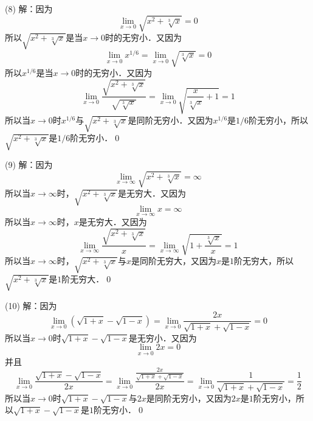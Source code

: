 \medskip
(8) 解：因为
\begin{equation}
    \lim_{x \to 0} \sqrt{x^2+\sqrt[3]{x}} = 0
\end{equation}
所以$\sqrt{x^2+\sqrt[3]{x}}$是当$x \to 0$时的无穷小．又因为
\begin{equation}
    \lim_{x \to 0} {\displaystyle x^{1/6}} = \lim_{x \to 0} \sqrt{\sqrt[3]{x}} = 0
\end{equation}
所以$x^{1/6}$是当$x \to 0$时的无穷小．又因为
\begin{equation}
    \lim_{x \to 0} \displaystyle\frac{\sqrt{x^2+\sqrt[3]{x}}}{\sqrt{\sqrt[3]{x}}} = \lim_{x \to 0} \displaystyle\sqrt{\displaystyle\frac{x}{\sqrt[3]{x}}+1} = 1
\end{equation}
所以当$x \to 0$时$x^{1/6}$与$\displaystyle\sqrt{x^2+\sqrt[3]{x}}$是同阶无穷小．又因为$x^{1/6}$是$1/6$阶无穷小，所以$\displaystyle\sqrt{x^2+\sqrt[3]{x}}$是$1/6$阶无穷小．\qed

\medskip
(9) 解：因为
\begin{equation}
    \lim_{x \to \infty} \sqrt{x^2+\sqrt[3]{x}} = \infty
\end{equation}
所以当$x \to \infty$时，$\displaystyle\sqrt{x^2+\sqrt[3]{x}}$是无穷大．又因为
\begin{equation}
    \lim_{x \to \infty} x = \infty
\end{equation}
所以当$x \to \infty$时，$x$是无穷大．又因为
\begin{equation}
    \lim_{x \to \infty} \frac{\sqrt{x^2+\sqrt[3]{x}}}{x} = \lim_{x \to \infty} \sqrt{1 + \displaystyle\frac{\sqrt[3]{x}}{x}} = 1
\end{equation}
所以当$x \to \infty$时，$\sqrt{x^2+\sqrt[3]{x}}$与$x$是同阶无穷大，又因为$x$是$1$阶无穷大，所以$\sqrt{x^2 + \sqrt[3]{x}}$是$1$阶无穷大．\qed

\medskip
(10) 解：因为
\begin{equation}
    \lim_{x \to 0} \left( \sqrt{1+x} - \sqrt{1-x} \right) = \lim_{x \to 0} \frac{2x}{\sqrt{1+x}+\sqrt{1-x}} = 0
\end{equation}
所以当$x \to 0$时$\sqrt{1+x}-\sqrt{1-x}$是无穷小．又因为
\begin{equation}
    \lim_{x \to 0} 2x = 0
\end{equation}
并且
\begin{equation}
    \lim_{x \to 0} \displaystyle\frac{\sqrt{1+x}-\sqrt{1-x}}{2x}=\lim_{x \to 0} \displaystyle\frac{\displaystyle\frac{2x}{\sqrt{1+x}+\sqrt{1-x}}}{2x} = \lim_{x \to 0} \frac{1}{\sqrt{1+x}+\sqrt{1-x}} = \frac{1}{2}
\end{equation}
所以当$x \to 0$时$\sqrt{1+x}-\sqrt{1-x}$与$2x$是同阶无穷小，又因为$2x$是$1$阶无穷小，所以$\sqrt{1+x}-\sqrt{1-x}$是$1$阶无穷小．\qed

